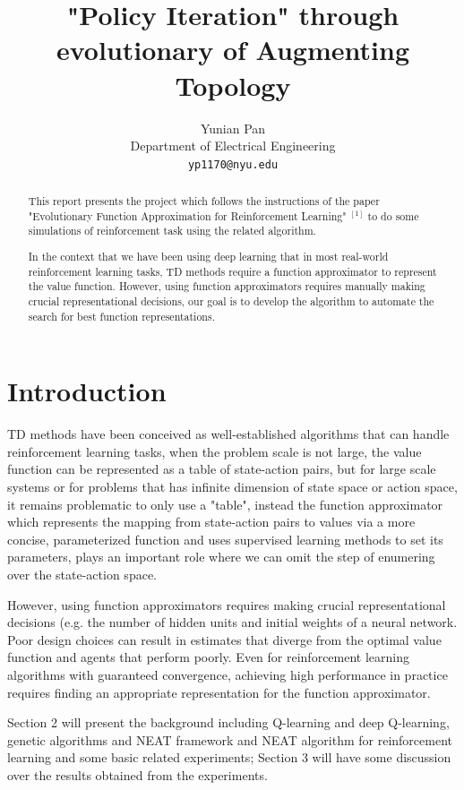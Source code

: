 \documentclass{article}
\title{"Policy Iteration" through evolutionary of Augmenting Topology}
\author{%
  Yunian Pan \\
  Department of Electrical Engineering \\ 
  \texttt{yp1170@nyu.edu} 
}
\begin{document}
\maketitle

\begin{abstract}
  This report presents the project which follows the instructions of the paper "Evolutionary Function Approximation for Reinforcement Learning" $^{[1]}$ to do some
  simulations of reinforcement task using the related algorithm. 
  
  In the context that we have been using deep learning that in most real-world reinforcement learning tasks, 
TD methods require a function approximator to represent the value function. However, using function approximators
 requires manually making crucial representational decisions, our goal is to develop the algorithm to automate the search for 
 best function representations.
 


\end{abstract}

\section{Introduction}
TD methods have been conceived as well-established algorithms that can handle reinforcement learning tasks, when the problem scale is not large, the value function can be represented as a table of state-action pairs, but for large scale systems or for problems that has infinite dimension of 
state space or action space, it remains problematic to only use a "table", instead the function approximator which represents the mapping from state-action pairs to values via a more concise,
parameterized function and uses supervised learning methods to set its parameters, plays an important role where we can omit the step of enumering over
the state-action space.

However, using function approximators requires making crucial representational decisions (e.g. the number of hidden units and initial weights of a neural network. 
Poor design choices can result in estimates that diverge from the optimal value function and agents that perform poorly. Even for reinforcement learning algorithms 
with guaranteed convergence, achieving high performance in practice requires finding an appropriate representation for the function approximator. 

Section 2 will present the background including Q-learning and deep Q-learning, genetic algorithms and NEAT framework and NEAT algorithm for reinforcement learning and some basic related experiments;
Section 3 will have some discussion over the results obtained from the experiments.
\end{document}

